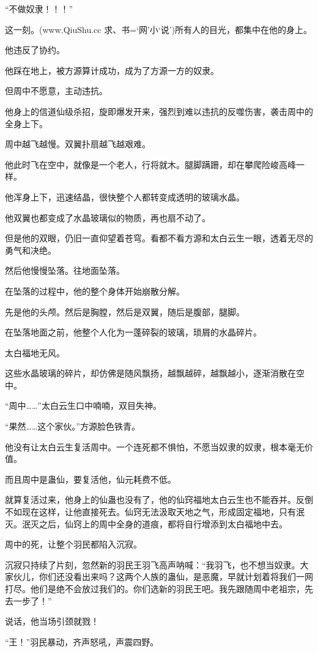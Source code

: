 \begin{this_body}
“不做奴隶！！！”

这一刻。(www.QiuShu.cc 求、书=‘网’小‘说’)所有人的目光，都集中在他的身上。

他违反了协约。

他踩在地上，被方源算计成功，成为了方源一方的奴隶。

但周中不愿意，主动违抗。

他身上的信道仙级杀招，旋即爆发开来，强烈到难以违抗的反噬伤害，袭击周中的全身上下。

周中越飞越慢。双翼扑扇越飞越艰难。

他此时飞在空中，就像是一个老人，行将就木。腿脚蹒跚，却在攀爬险峻高峰一样。

他浑身上下，迅速结晶，很快整个人都转变成透明的玻璃水晶。

他双翼也都变成了水晶玻璃似的物质，再也扇不动了。

但是他的双眼，仍旧一直仰望着苍穹。看都不看方源和太白云生一眼，透着无尽的勇气和决绝。

然后他慢慢坠落。往地面坠落。

在坠落的过程中，他的整个身体开始崩散分解。

先是他的头颅。然后是胸膛，然后是双翼，随后是腹部，腿脚。

在坠落地面之前，他整个人化为一蓬碎裂的玻璃，琐屑的水晶碎片。

太白福地无风。

这些水晶玻璃的碎片，却仿佛是随风飘扬，越飘越碎，越飘越小，逐渐消散在空中。

“周中……”太白云生口中喃喃，双目失神。

“果然……这个家伙。”方源脸色铁青。

他没有让太白云生复活周中。一个连死都不惧怕，不愿当奴隶的奴隶，根本毫无价值。

而且周中是蛊仙，要复活他，仙元耗费不低。

就算复活过来，他身上的仙蛊也没有了，他的仙窍福地太白云生也不能吞并。反倒不如现在这样，让他直接死去。仙窍无法汲取天地之气，形成固定福地，只有泯灭。泯灭之后，仙窍上的周中全身的道痕，都将自行增添到太白福地中去。

周中的死，让整个羽民都陷入沉寂。

沉寂只持续了片刻，忽然新的羽民王羽飞高声呐喊：“我羽飞，也不想当奴隶。大家伙儿，你们还没看出来吗？这两个人族的蛊仙，是恶魔，早就计划着将我们一网打尽。他们是绝不会放过我们的。你们选新的羽民王吧。我先跟随周中老祖宗，先去一步了！”

说话，他当场引颈就戮！

“王！”羽民暴动，齐声怒吼，声震四野。


\end{this_body}
